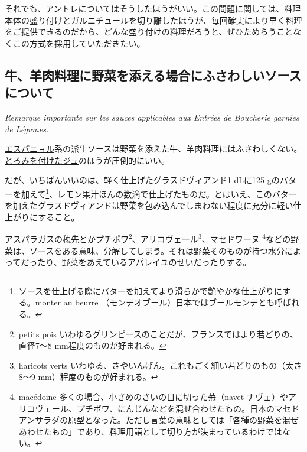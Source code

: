 それでも、アントレについてはそうしたほうがいい。この問題に関しては、料理本体の盛り付けとガルニチュールを切り離したほうが、毎回確実により早く料理をご提供できるのだから、どんな盛り付けの料理だろうと、ぜひためらうことなくこの方式を採用していただきたい。

\hypertarget{remarque-importante-sur-les-sauces-applicables-aux-entrees-de-boucherie-garnie-de-legumes}{%
\subsection{牛、羊肉料理に野菜を添える場合にふさわしいソースについて}\label{remarque-importante-sur-les-sauces-applicables-aux-entrees-de-boucherie-garnie-de-legumes}}

\vspace{-1\zw}
\begin{center}
\textit{Remarque importante sur les sauces applicables aux Entrées de Boucherie garnies de Légumes.}
\end{center}


\vspace{1\zw}

\protect\hyperlink{sauce-espagnole}{エスパニョル}系の派生ソースは野菜を添えた牛、羊肉料理にはふさわしくない。\protect\hyperlink{jus-de-veau-lie}{とろみを付けたジュ}のほうが圧倒的にいい。

だが、いちばんいいのは、軽く仕上げた\protect\hyperlink{glace-de-viande}{グラスドヴィアンド}1
dLに125 gのバターを加えて\footnote{ソースを仕上げる際にバターを加えてより滑らかで艶やかな仕上がりにする。monter
  au beurre （モンテオブール）日本ではブールモンテとも呼ばれる。}、レモン果汁ほんの数滴で仕上げたものだ。とはいえ、このバターを加えたグラスドヴィアンドは野菜を包み込んでしまわない程度に充分に軽い仕上がりにすること。

アスパラガスの穂先とかプチポワ\footnote{petits pois
  いわゆるグリンピースのことだが、フランスではより若どりの、直径7〜8
  mm程度のものが好まれる。}、アリコヴェール\footnote{haricots verts
  いわゆる、さやいんげん。これもごく細い若どりのもの（太さ8〜9
  mm）程度のものが好まれる。}、マセドワーヌ \footnote{macédoine
  多くの場合、小さめのさいの目に切った蕪（navet
  ナヴェ）やアリコヴェール、プチポワ、にんじんなどを混ぜ合わせたもの。日本のマセドアンサラダの原型となった。ただし言葉の意味としては「各種の野菜を混ぜあわせたもの」であり、料理用語として切り方が決まっているわけではない。}などの野菜は、ソースをある意味、分解してしまう。それは野菜そのものが持つ水分によってだったり、野菜をあえているアパレイユのせいだったりする。

